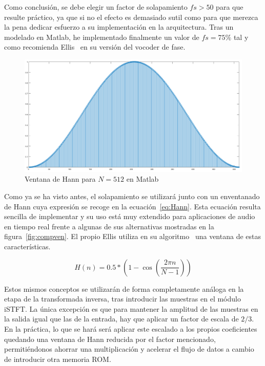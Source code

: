 Como conclusión, se debe elegir un factor de solapamiento $fs > 50$ para que resulte práctico, ya que si no el efecto es demasiado sutil como para que merezca la pena dedicar esfuerzo a su implementación en la arquitectura. Tras un modelado en Matlab, he implementado finalmente un valor de $fs = 75\%$ tal y como recomienda Ellis~\cite{Ellis} en su versión del vocoder de fase.

\begin{figure}[!b]
\begin{center}
\includegraphics[width=14cm]{img/ventana_utilizada.png}
\caption{\label{fig:used_win}Ventana de Hann para $N = 512$ en Matlab}
\end{center}
\end{figure}

Como ya se ha visto antes, el solapamiento se utilizará junto con un enventanado de Hann cuya expresión se recoge en la ecuación~\ref{eq:Hann}. Esta ecuación resulta sencilla de implementar y su uso está muy extendido para aplicaciones de audio en tiempo real frente a algunas de sus alternativas mostradas en la figura~\ref{fig:compven}. El propio Ellis utiliza en su algoritmo~\cite{Ellis} una ventana de estas características.

\begin{equation}
\label{eq:Hann}
 H(n) = 0.5 * \left(1 - \cos\left(\frac{2\pi n}{N - 1}\right)\right)
 \end{equation} 
 
Estos mismos conceptos se utilizarán de forma completamente análoga en la etapa de la transformada inversa, tras introducir las muestras en el módulo iSTFT. La única excepción es que para mantener la amplitud de las muestras en la salida igual que las de la entrada, hay que aplicar un factor de escala de $2/3$. En la práctica, lo que se hará será aplicar este escalado a los propios coeficientes quedando una ventana de Hann reducida por el factor mencionado, permitiéndonos ahorrar una multiplicación y acelerar el flujo de datos a cambio de introducir otra memoria ROM.

